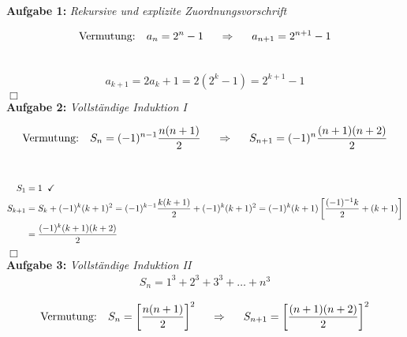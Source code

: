 
\textbf{Aufgabe 1: } \emph{Rekursive und explizite Zuordnungsvorschrift}\\
\begin{minipage}{0.5\linewidth}
\begin{align*}
\text{Vermutung: }\hspace{0.2cm} a_n=2^n-1 \hspace{0.5cm} \Rightarrow \hspace{0.5cm} a_{n+1}=2^{n+1}-1
\end{align*}
\end{minipage}\\
\begin{align*}
a_{k+1}=2a_k+1=2\left(2^k-1\right)=2^{k+1}-1
\end{align*}\hfill $\Box$\\[0.7cm]
%
\textbf{Aufgabe 2: } \emph{Vollständige Induktion I}\\
\begin{minipage}{0.6\linewidth}
\begin{align*}
\text{Vermutung: }\hspace{0.2cm} S_n=(-1)^{n-1}\frac{n(n+1)}{2} \hspace{0.5cm} \Rightarrow \hspace{0.5cm} S_{n+1}=(-1)^n\frac{(n+1)(n+2)}{2}
\end{align*}
\end{minipage}\\
\begin{align*}
S_1&=1 \hspace{0.2cm}\checkmark\\
S_{k+1}&=S_k+(-1)^k(k+1)^2=(-1)^{k-1}\frac{k(k+1)}{2}+(-1)^k(k+1)^2=(-1)^k(k+1)\left[\frac{(-1)^{-1}k}{2}+(k+1)\right]\\
&=\frac{(-1)^{k}(k+1)(k+2)}{2} 
\end{align*}\hfill $\Box$\\[0.7cm]
%
\textbf{Aufgabe 3: } \emph{Vollständige Induktion II}
\begin{align*}
S_n=1^3+2^3+3^3+\dots+n^3
\end{align*}
\begin{minipage}{0.6\linewidth}
\begin{align*}
\text{Vermutung: }\hspace{0.2cm} S_n=\left[\frac{n(n+1)}{2}\right]^2 \hspace{0.5cm} \Rightarrow \hspace{0.5cm} S_{n+1}=\left[\frac{(n+1)(n+2)}{2}\right]^2
\end{align*}
\end{minipage}\\
